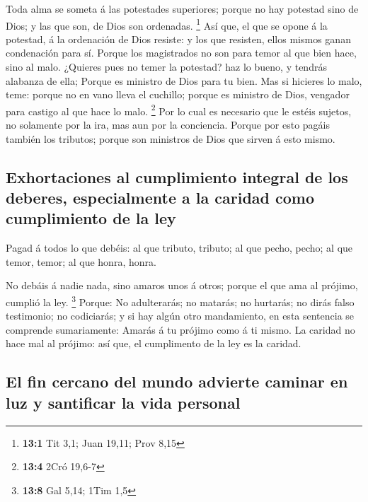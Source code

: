  Toda alma se someta á las potestades superiores; porque
no hay potestad sino de Dios; y las que son, de Dios son ordenadas.
\footnote{\textbf{13:1} Tit 3,1; Juan 19,11; Prov 8,15} 
Así que, el que se opone á la potestad, á la ordenación de Dios resiste:
y los que resisten, ellos mismos ganan condenación para sí.
 Porque los magistrados no son para temor al que bien
hace, sino al malo. ¿Quieres pues no temer la potestad? haz lo bueno, y
tendrás alabanza de ella;  Porque es ministro de Dios para
tu bien. Mas si hicieres lo malo, teme: porque no en vano lleva el
cuchillo; porque es ministro de Dios, vengador para castigo al que hace
lo malo. \footnote{\textbf{13:4} 2Cró 19,6-7}  Por lo cual
es necesario que le estéis sujetos, no solamente por la ira, mas aun por
la conciencia.  Porque por esto pagáis también los
tributos; porque son ministros de Dios que sirven á esto mismo.

\hypertarget{exhortaciones-al-cumplimiento-integral-de-los-deberes-especialmente-a-la-caridad-como-cumplimiento-de-la-ley}{%
\subsection{Exhortaciones al cumplimiento integral de los deberes,
especialmente a la caridad como cumplimiento de la
ley}\label{exhortaciones-al-cumplimiento-integral-de-los-deberes-especialmente-a-la-caridad-como-cumplimiento-de-la-ley}}

 Pagad á todos lo que debéis: al que tributo, tributo; al
que pecho, pecho; al que temor, temor; al que honra, honra.

 No debáis á nadie nada, sino amaros unos á otros; porque
el que ama al prójimo, cumplió la ley. \footnote{\textbf{13:8} Gal 5,14;
  1Tim 1,5}  Porque: No adulterarás; no matarás; no
hurtarás; no dirás falso testimonio; no codiciarás; y si hay algún otro
mandamiento, en esta sentencia se comprende sumariamente: Amarás á tu
prójimo como á ti mismo.  La caridad no hace mal al
prójimo: así que, el cumplimento de la ley es la caridad.

\hypertarget{el-fin-cercano-del-mundo-advierte-caminar-en-luz-y-santificar-la-vida-personal}{%
\subsection{El fin cercano del mundo advierte caminar en luz y
santificar la vida
personal}\label{el-fin-cercano-del-mundo-advierte-caminar-en-luz-y-santificar-la-vida-personal}}

